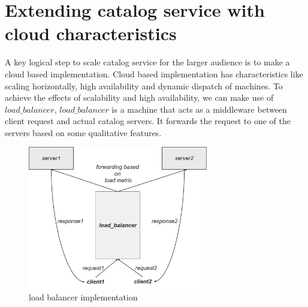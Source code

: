 \section{Extending catalog service with cloud characteristics}
A key logical step to scale catalog service for the larger audience is to make a cloud based implementation. Cloud based implementation has characteristics like scaling horizontally, high availability and dynamic dispatch of machines. To achieve the effects of scalability and high availability, we can make use of $load\_balancer$, $load\_balancer$ is a machine that acts as a middleware between client request and actual catalog servers. It forwards the request to one of the servers based on some qualitative features.
\newline
\begin{figure}[h]
    \centering
    \includegraphics[width=0.7\textwidth]{pix/Picture7}
    \caption{load balancer implementation}
    \label{p7}
\end{figure}


